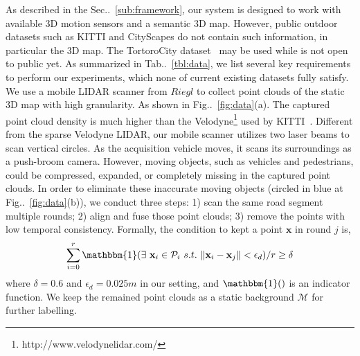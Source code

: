 \documentclass[10pt,twocolumn,letterpaper]{article}
\makeatletter
\newcommand{\figref}[1]{Fig\onedot~\ref{#1}}
\newcommand{\secref}[1]{Sec\onedot~\ref{#1}}
\newcommand{\tabref}[1]{Tab\onedot~\ref{#1}}
\newcommand{\ve}[1]{{\mathbf #1}} %
\newcommand{\hua}[1]{{\mathcal #1}}
\DeclareRobustCommand\onedot{\futurelet\@let@token\@onedot}
\def\onedot{\ifx\@let@token.\else.\null\fi\xspace}
\makeatother
\begin{document}
As described in the \secref{sub:framework}, our system is designed to work with available 3D motion sensors and a semantic 3D map.
However, public outdoor datasets such as KITTI and CityScapes do not contain such information, in particular the 3D map. The TortoroCity dataset~\cite{wang2016torontocity} may be used while is not open to public yet. As summarized in \tabref{tbl:data}, we list several key requirements to perform our experiments, which none of current existing datasets fully satisfy.  
We use a mobile LIDAR scanner from $Riegl$ to collect point clouds of the static 3D map with high granularity. As shown in \figref{fig:data}(a). The captured point cloud density is much higher than the Velodyne\footnote{http://www.velodynelidar.com/} used by KITTI~\cite{geiger2012we}.
Different from the sparse Velodyne LIDAR, our mobile scanner utilizes two laser beams to scan vertical circles. As the acquisition vehicle moves, it scans its surroundings as a push-broom camera. However, moving objects, such as vehicles and pedestrians, could be compressed, expanded, or completely missing in the captured point clouds.
In order to eliminate these inaccurate moving objects (circled in blue at \figref{fig:data}(b)), we conduct three steps:
1) scan the same road segment multiple rounds; 2) align and fuse those point clouds; 3) remove the points with low temporal consistency.
Formally, the condition to kept a point $\ve{x}$ in round $j$ is,
{\vspace{-0.5\baselineskip}
\begin{align}
\sum_{i=0}^{r}{\mathbbm{1}(\exists~\ve{x}_i \in \hua{P}_i~s.t.~\|\ve{x}_i - \ve{x}_j\| < \epsilon_d )} / r \geq \delta
\end{align}
}
where $\delta = 0.6$ and $\epsilon_d = 0.025m$ in our setting, and $\mathbbm{1}()$ is an indicator function. 
We keep the remained point clouds as a static background $\hua{M}$ for further labelling.
\end{document}
